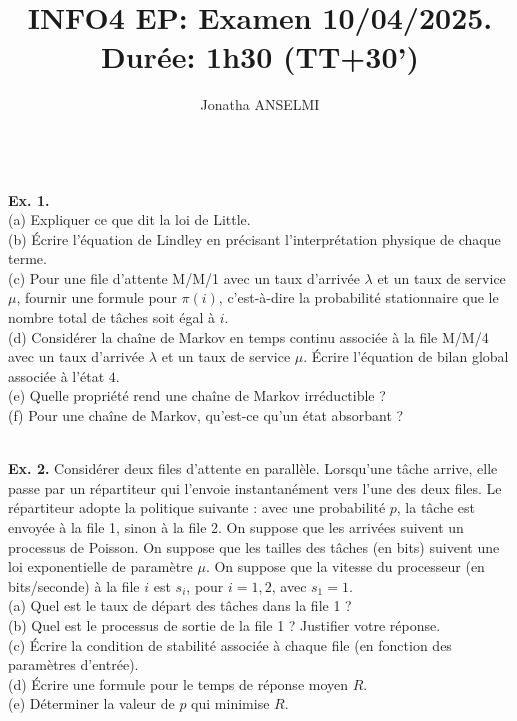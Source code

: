 \documentclass[journalpaper, 12pt]{article}
\title{
INFO4 EP: Examen 10/04/2025.
Durée: 1h30 (TT+30')
}
\author{Jonatha ANSELMI}
\date{}
\theoremstyle{definition}
\begin{document}
\maketitle
 \vspace{-0.7cm}


\begin{large}

\ \\
\noindent
{\bf Ex. 1.}
\ \\
\noindent
(a) Expliquer ce que dit la loi de Little.
\ \\
\noindent
(b) Écrire l'équation de Lindley en précisant l'interprétation physique de chaque terme.
\ \\
\noindent
(c) Pour une file d’attente M/M/1 avec un taux d’arrivée $\lambda$ et un taux de service $\mu$, fournir une formule pour $\pi(i)$, c’est-à-dire la probabilité stationnaire que le nombre total de tâches soit égal à $i$.
\ \\
\noindent
(d) Considérer la chaîne de Markov en temps continu associée à la file M/M/4 avec un taux d’arrivée $\lambda$ et un taux de service $\mu$. Écrire l’équation de bilan global associée à l’état $4$.
\ \\
\noindent
(e) Quelle propriété rend une chaîne de Markov irréductible ?
\ \\
\noindent
(f) Pour une chaîne de Markov, qu’est-ce qu’un état absorbant ?

\ \\
\noindent
{\bf Ex. 2.}
Considérer deux files d’attente en parallèle. Lorsqu’une tâche arrive, elle passe par un répartiteur qui l’envoie instantanément vers l’une des deux files.
Le répartiteur adopte la politique suivante : avec une probabilité $p$, la tâche est envoyée à la file 1, sinon à la file 2.
On suppose que les arrivées suivent un processus de Poisson.
On suppose que les tailles des tâches (en bits) suivent une loi exponentielle de paramètre $\mu$.
On suppose que la vitesse du processeur (en bits/seconde) à la file $i$ est $s_i$, pour $i=1,2$, avec $s_1=1$.
\ \\
\noindent
(a) Quel est le taux de départ des tâches dans la file 1 ?
\ \\
\noindent
(b) Quel est le processus de sortie de la file 1 ? Justifier votre réponse.
\ \\
\noindent
(c) Écrire la condition de stabilité associée à chaque file (en fonction des paramètres d’entrée).
\ \\
\noindent
(d) Écrire une formule pour le temps de réponse moyen $R$.
\ \\
\noindent
(e) Déterminer la valeur de $p$ qui minimise $R$.


\end{large}
\end{document}
